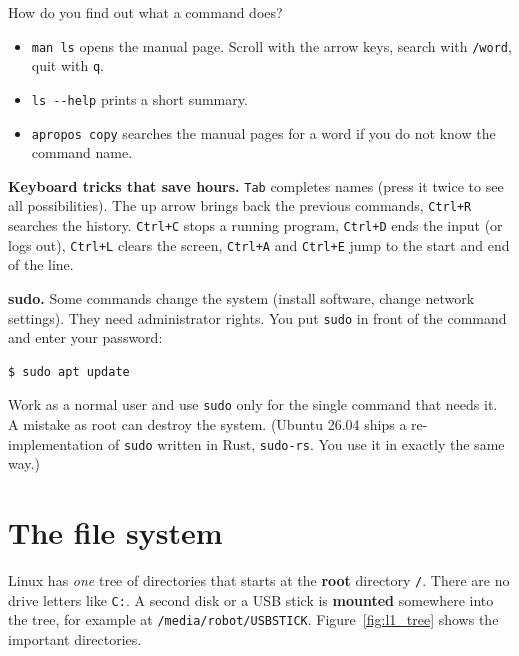 How do you find out what a command does?
\begin{itemize}[nosep]
  \item \verb|man ls| opens the manual page. Scroll with the arrow keys, search with \texttt{/word}, quit with \texttt{q}.
  \item \verb|ls --help| prints a short summary.
  \item \verb|apropos copy| searches the manual pages for a word if you do not know the command name.
\end{itemize}

\textbf{Keyboard tricks that save hours.} \texttt{Tab} completes names (press it twice to see all possibilities). The up arrow brings back the previous commands, \texttt{Ctrl+R} searches the history. \texttt{Ctrl+C} stops a running program, \texttt{Ctrl+D} ends the input (or logs out), \texttt{Ctrl+L} clears the screen, \texttt{Ctrl+A} and \texttt{Ctrl+E} jump to the start and end of the line.

\textbf{sudo.} Some commands change the system (install software, change network settings). They need administrator rights. You put \texttt{sudo} in front of the command and enter your password:
\begin{verbatim}
$ sudo apt update
\end{verbatim}
Work as a normal user and use \texttt{sudo} only for the single command that needs it. A mistake as root can destroy the system. (Ubuntu 26.04 ships a re-implementation of \texttt{sudo} written in Rust, \texttt{sudo-rs}. You use it in exactly the same way.)

\section*{The file system}
Linux has \emph{one} tree of directories that starts at the \textbf{root} directory \texttt{/}. There are no drive letters like \texttt{C:}. A second disk or a USB stick is \textbf{mounted} somewhere into the tree, for example at \texttt{/media/robot/USBSTICK}. Figure~\ref{fig:l1_tree} shows the important directories.

